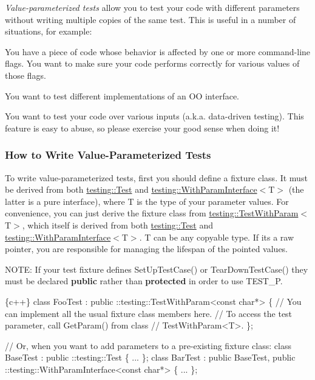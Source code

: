 {\itshape Value-\/parameterized tests} allow you to test your code with different parameters without writing multiple copies of the same test. This is useful in a number of situations, for example\+:


\begin{DoxyItemize}
\item You have a piece of code whose behavior is affected by one or more command-\/line flags. You want to make sure your code performs correctly for various values of those flags.
\item You want to test different implementations of an OO interface.
\item You want to test your code over various inputs (a.\+k.\+a. data-\/driven testing). This feature is easy to abuse, so please exercise your good sense when doing it!
\end{DoxyItemize}

\subsubsection*{How to Write Value-\/\+Parameterized Tests}

To write value-\/parameterized tests, first you should define a fixture class. It must be derived from both {\ttfamily \hyperlink{classtesting_1_1Test}{testing\+::\+Test}} and {\ttfamily \hyperlink{classtesting_1_1WithParamInterface}{testing\+::\+With\+Param\+Interface}$<$T$>$} (the latter is a pure interface), where {\ttfamily T} is the type of your parameter values. For convenience, you can just derive the fixture class from {\ttfamily \hyperlink{classtesting_1_1TestWithParam}{testing\+::\+Test\+With\+Param}$<$T$>$}, which itself is derived from both {\ttfamily \hyperlink{classtesting_1_1Test}{testing\+::\+Test}} and {\ttfamily \hyperlink{classtesting_1_1WithParamInterface}{testing\+::\+With\+Param\+Interface}$<$T$>$}. {\ttfamily T} can be any copyable type. If it\textquotesingle{}s a raw pointer, you are responsible for managing the lifespan of the pointed values.

N\+O\+TE\+: If your test fixture defines {\ttfamily Set\+Up\+Test\+Case()} or {\ttfamily Tear\+Down\+Test\+Case()} they must be declared {\bfseries public} rather than {\bfseries protected} in order to use {\ttfamily T\+E\+S\+T\+\_\+P}.


\begin{DoxyCode}
\{c++\}
class FooTest :
    public ::testing::TestWithParam<const char*> \{
  // You can implement all the usual fixture class members here.
  // To access the test parameter, call GetParam() from class
  // TestWithParam<T>.
\};

// Or, when you want to add parameters to a pre-existing fixture class:
class BaseTest : public ::testing::Test \{
  ...
\};
class BarTest : public BaseTest,
                public ::testing::WithParamInterface<const char*> \{
  ...
\};
\end{DoxyCode}


